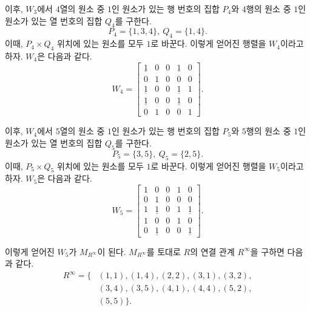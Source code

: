 \documentclass{oblivoir}
\begin{document}
이후, $W_3$에서 $4$열의 원소 중 $1$인 원소가 있는 행 번호의 집합 $P_4$와
$4$행의 원소 중 $1$인 원소가 있는 열 번호의 집합 $Q_4$를 구한다.
\begin{equation}
    P_4 = \{1, 3, 4\},\ Q_4 = \{1, 4\}.
\end{equation}
이때, $P_4 \times Q_4$ 위치에 있는 원소를 모두 $1$로 바꾼다.
이렇게 얻어진 행렬을 $W_4$이라고 하자.
$W_4$은 다음과 같다.
\begin{equation}
    W_4 = \begin{bmatrix}
        \underline 1 & 0 & 0 & \underline 1 & 0 \\
        0 & 1 & 0 & 0 & 0 \\
        \underline 1 & 0 & 0 & \underline 1 & 1 \\
        \underline 1 & 0 & 0 & \underline 1 & 0 \\
        0 & 1 & 0 & 0 & 1
    \end{bmatrix}.
\end{equation}

이후, $W_4$에서 $5$열의 원소 중 $1$인 원소가 있는 행 번호의 집합 $P_5$와
$5$행의 원소 중 $1$인 원소가 있는 열 번호의 집합 $Q_5$를 구한다.
\begin{equation}
    P_5 = \{3,5\},\ Q_5 = \{2,5\}.
\end{equation}
이때, $P_5 \times Q_5$ 위치에 있는 원소를 모두 $1$로 바꾼다.
이렇게 얻어진 행렬을 $W_5$이라고 하자.
$W_5$은 다음과 같다.
\begin{equation}
    W_5 = \begin{bmatrix}
        1 & 0 & 0 & 1 & 0 \\
        0 & 1 & 0 & 0 & 0 \\
        1 & \underline 1 & 0 & 1 & \underline 1 \\
        1 & 0 & 0 & 1 & 0 \\
        0 & \underline 1 & 0 & 0 & \underline 1
    \end{bmatrix}.
\end{equation}

이렇게 얻어진 $W_5$가 $M_{R^\infty}$이 된다.
$M_{R^\infty}$를 토대로 $R$의 연결 관계 $R^\infty$을 구하면 다음과 같다.
\begin{equation}
    \begin{aligned}
        R^\infty = \{
            & (1, 1), (1, 4), (2, 2), (3, 1), (3, 2), \\
            & (3, 4), (3, 5), (4, 1), (4, 4), (5, 2), \\
            & (5, 5)\}.
    \end{aligned}
\end{equation}
\end{document}
